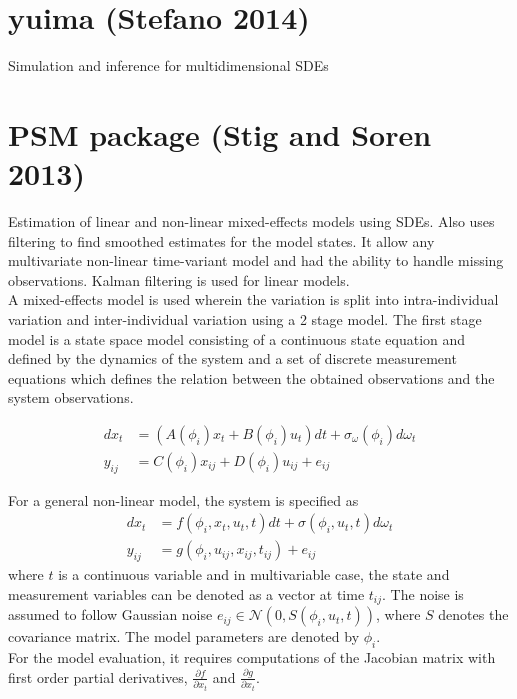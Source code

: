 \documentclass[a4paper,11pt]{article}\usepackage[]{graphicx}\usepackage[]{color}
\begin{document}
\section{yuima (Stefano 2014)}
Simulation and inference for multidimensional SDEs

\section{PSM package (Stig and Soren 2013)}
Estimation of linear and non-linear mixed-effects models using SDEs. Also uses filtering to find smoothed estimates for the model states. It allow any multivariate non-linear time-variant model and had the ability to handle missing observations. Kalman filtering is used for linear models. \\

A mixed-effects model is used wherein the variation is split into intra-individual variation and inter-individual variation using a 2 stage model. The first stage model is a state space model consisting of a continuous state equation and defined by the dynamics of the system and a set of discrete measurement equations which defines the relation between the obtained observations and the system observations.

\begin{align*}
dx_t & = (A(\phi_i) x_t + B(\phi_i) u_t)dt + \sigma_{\omega}(\phi_i) d \omega_t \\
y_{ij} & = C(\phi_i) x_{ij} + D(\phi_i) u_{ij} + e_{ij}
\end{align*}

For a general non-linear model, the system is specified as
\begin{align*}
dx_t & = f(\phi_i, x_t, u_t, t)dt + \sigma(\phi_i, u_t, t) d \omega_t \\
y_{ij} & = g(\phi_i, u_{ij}, x_{ij}, t_{ij}) + e_{ij}
\end{align*}
where $t$ is a continuous variable and in multivariable case, the state and measurement variables can be denoted as a vector at time $t_{ij}$. The noise is assumed to follow Gaussian noise $e_{ij} \in \mathcal{N}(0, S(\phi_i, u_t, t))$, where $S$ denotes the covariance matrix. The model parameters are denoted by $\phi_i$. \\

For the model evaluation, it requires computations of the Jacobian matrix with first order partial derivatives, $\frac{\partial f}{\partial x_t}$ and $\frac{\partial g}{\partial x_t}$. \\
\end{document}
